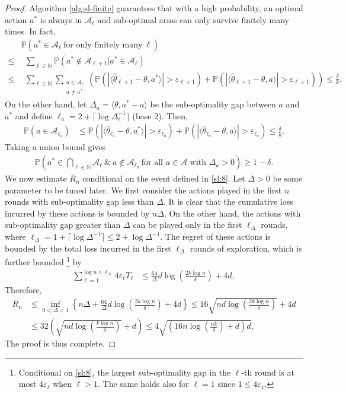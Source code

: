 \documentclass[letterpaper,11pt,openright,openany]{book}
\numberwithin{equation}{section}
\theoremstyle{plain}
\theoremstyle{definition}
\def\N{{\mathbb N}}
\def\P{{\mathbb P}}
\def\e{{\varepsilon}}
\def\t{{\theta}}
\begin{document}
\begin{proof}
Algorithm \ref{alg:sl-finite} guarantees that with a high probability, an optimal action $a^*$ is always in $\mathcal A_\ell$ and sub-optimal arms can only survive finitely many times. In fact, 
\begin{align*}
&\P\left(a^*\in\mathcal A_\ell\  \text{for only finitely many}\ \ell \right)\\
\leq&\ \  \sum_{\ell\in\N}\P\left(a^*\notin\mathcal A_{\ell+1}|a^*\in\mathcal A_{\ell}\right)\\
\leq&\ \ \sum_{\ell\in\N}\sum_{\substack{a\in\mathcal A_\ell\\ a\neq a^*}}\left(\P\left(|\langle\hat{\t}_{\ell+1}-\t, a^*\rangle|>\e_{\ell+1}\right)+\P\left(|\langle\hat{\t}_{\ell+1}-\t, a\rangle|>\e_{\ell+1}\right)\right)\leq\frac{\delta}{k}.
\end{align*}
On the other hand, let $\Delta_a = \langle\t, a^*-a\rangle$ be the sub-optimality gap between $a$ and $a^*$ and define $\ell_a = 2+\lceil\log\Delta_\ell^{-1}\rceil$ (base 2). Then, 
\begin{align*}
\P\left(a\in\mathcal A_{\ell_a}\right)&\leq \P\left(|\langle\hat{\t}_{\ell_a}-\t, a^*\rangle|>\e_{\ell_a}\right)+\P\left(|\langle\hat{\t}_{\ell_a}-\t, a\rangle|>\e_{\ell_a}\right)\leq \frac{\delta}{k}. 
\end{align*}
Taking a union bound gives
\begin{align}
\P\left(a^*\in\bigcap_{\ell\in\N}\mathcal A_\ell\ \&\ a\notin \mathcal A_{\ell_a}\ \text{for all $a\in\mathcal A$ with $\Delta_a>0$} \right)\geq 1-\delta. \label{sl:8}
\end{align}
We now estimate $\bar{R}_n$ conditional on the event defined in \eqref{sl:8}. Let $\Delta>0$ be some parameter to be tuned later. We first consider the actions played in the first $n$ rounds with sub-optimality gap less than $\Delta$. It is clear that the cumulative loss incurred by these actions is bounded by $n\Delta$. On the other hand, the actions with sub-optimality gap greater than $\Delta$ can be played only in the first $\ell_\Delta$ rounds, where $\ell_\Delta = 1+\lceil\log\Delta^{-1}\rceil\leq 2+\log\Delta^{-1}$. The regret of these actions is bounded by the total loss incurred in the first $\ell_\Delta$ rounds of exploration, which is further bounded \footnote{Conditional on \eqref{sl:8}, the largest sub-optimality gap in the $\ell$-th round is at most $4\e_\ell$ when $\ell>1$. The same holds also for $\ell=1$ since $1\leq 4\e_1$.} by  
\begin{align*}
\sum_{\ell = 1}^{\log n\wedge \ell_\Delta}4\e_\ell T_\ell &\leq \frac{64}{\Delta}d\log\left(\frac{2k\log n}{\delta}\right) + 4d,
\end{align*} 
 Therefore, 
\begin{align*}
\bar{R}_n&\leq\inf_{0<\Delta<1}\left\{n\Delta+\frac{64}{\Delta}d\log\left(\frac{2k\log n}{\delta}\right)+4d\right\}\leq 16\sqrt{nd\log\left(\frac{2k\log n}{\delta}\right)}+4d\\
&\leq 32\left(\sqrt{nd\log\left(\frac{k\log n}{\delta}\right)}+d\right)\leq 4\sqrt{\left(16n\log\left(\frac{nk}{\delta}\right)+d\right)d}. 
\end{align*}
The proof is thus complete. 
\end{proof}
\end{document}
